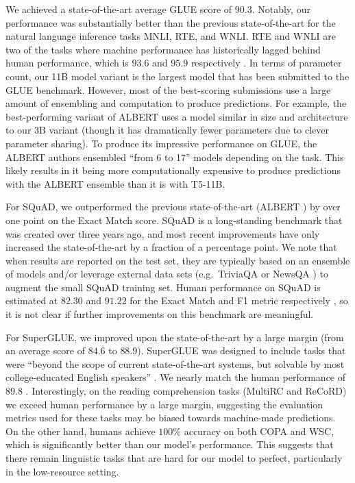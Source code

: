 We achieved a state-of-the-art average GLUE score of $90.3$. Notably, our performance was substantially better than the previous state-of-the-art for the natural language inference tasks MNLI, RTE, and WNLI. RTE and WNLI are two of the tasks where machine performance has historically lagged behind human performance, which is $93.6$ and $95.9$ respectively \citep{wang2018glue}. In terms of parameter count, our 11B model variant is the largest model that has been submitted to the GLUE benchmark. However, most of the best-scoring submissions use a large amount of ensembling and computation to produce predictions. For example, the best-performing variant of ALBERT \citep{lan2019albert} uses a model similar in size and architecture to our 3B variant (though it has dramatically fewer parameters due to clever parameter sharing). To produce its impressive performance on GLUE, the ALBERT authors ensembled ``from 6 to 17'' models depending on the task. This likely results in it being more computationally expensive to produce predictions with the ALBERT ensemble than it is with T5-11B.

For SQuAD, we outperformed the previous state-of-the-art (ALBERT \citep{lan2019albert}) by over one point on the Exact Match score. SQuAD is a long-standing benchmark that was created over three years ago, and most recent improvements have only increased the state-of-the-art by a fraction of a percentage point. We note that when results are reported on the test set, they are typically based on an ensemble of models and/or leverage external data sets (e.g.\ TriviaQA \citep{joshi2017triviaqa} or NewsQA \citep{trischler2016newsqa}) to augment the small SQuAD training set. Human performance on SQuAD is estimated at $82.30$ and $91.22$ for the Exact Match and F1 metric respectively \citep{rajpurkar2016squad}, so it is not clear if further improvements on this benchmark are meaningful.

For SuperGLUE, we improved upon the state-of-the-art by a large margin (from an average score of $84.6$ \citep{liu2019roberta} to $88.9$). SuperGLUE was designed to include tasks that were ``beyond the scope of current state-of-the-art systems, but solvable by most college-educated English speakers'' \citep{wang2019superglue}. We nearly match the human performance of $89.8$ \citep{wang2019superglue}. Interestingly, on the reading comprehension tasks (MultiRC and ReCoRD) we exceed human performance by a large margin, suggesting the evaluation metrics used for these tasks may be biased towards machine-made predictions. On the other hand, humans achieve $100\%$ accuracy on both COPA and WSC, which is significantly better than our model's performance. This suggests that there remain linguistic tasks that are hard for our model to perfect, particularly in the low-resource setting.

